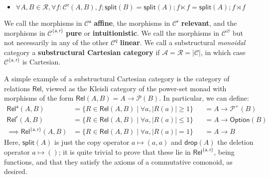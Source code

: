 \documentclass[acmsmall,screen,review]{acmart}
\newcommand{\mc}[1]{\ensuremath{\mathcal{#1}}}
\newcommand{\ms}[1]{\ensuremath{\mathsf{#1}}}
\begin{document}
\begin{definition}
\begin{itemize}
\begin{itemize}
      \item \(\forall A, B \in \mc{R}, \forall f: \mc{C}^{\ms{r}}(A, B), f;\ms{split}(B) = \ms{split}(A);f \ltimes f = \ms{split}(A);f\rtimes f\)
    \end{itemize}
  \end{itemize}
  We call the morphisms in \(\mc{C}^{\ms{a}}\) \textbf{affine}, the
  morphisms in \(\mc{C}^{\ms{r}}\) \textbf{relevant}, and the morphisms in
  \(\mc{C}^{\{\ms{a}, \ms{r}\}}\) \textbf{pure} or \textbf{intuitionistic}. We
  call the morphisms in \(\mc{C}^\varnothing\) but not necessarily in any of the
  other \(\mc{C}^q\) \textbf{linear}. We call a substructural \textit{monoidal}
  category a \textbf{substructural Cartesian category} if \(\mc{A} = \mc{R} =
  |\mc{C}|\), in which case \(\mc{C}^{\{\ms{a}, \ms{r}\}}\) is Cartesian.
\end{definition}
A simple example of a substructural Cartesian category is the category of
relations \(\ms{Rel}\), viewed as the Kleisli category of the power-set monad
with morphisms of the form \(\ms{Rel}(A, B) = A \to \mc{P}(B)\). In particular,
we can define:
\begin{equation}
  \begin{aligned}
    \ms{Rel}^{\ms{a}}(A, B) 
    &= \{R \in \ms{Rel}(A, B) \mid \forall a, |R(a)| \geq 1\} 
    &&= A \to \mc{P}^+(B) \\
    \ms{Rel}^{\ms{r}}(A, B) 
    &= \{R \in \ms{Rel}(A, B) \mid \forall a, |R(a)| \leq 1\} 
    &&= A \to \ms{Option}(B) \\
    \implies \ms{Rel}^{\{\ms{a}, \ms{r}\}}(A, B) 
    &= \{R \in \ms{Rel}(A, B) \mid \forall a, |R(a)| = 1\} 
    &&= A \to B
  \end{aligned}
\end{equation}
Here, \(\ms{split}(A)\) is just the copy operator \(a \mapsto (a, a)\) and
\(\ms{drop}(A)\) the deletion operator \(a \mapsto ()\); it is quite trivial to
prove that these lie in \(\ms{Rel}^{\{\ms{a}, \ms{r}\}}\), being functions, and
that they satisfy the axioms of a commutative comonoid, as desired. 
\end{document}
